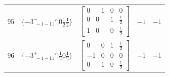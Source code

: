 \documentclass[fleqn,8pt]{jsarticle}
\begin{document}
\begin{longtable}{ccccc}
$ 95 $ & $ \{-3^{-}_{\,\,-1-11}{}'|0 \frac{1}{2} \frac{1}{2}\} $ & $ \begin{bmatrix} 0 & -1 & 0 & 0 \\ 0 & 0 & 1 & \frac{1}{2} \\ 1 & 0 & 0 & \frac{1}{2} \end{bmatrix} $ & $ -1 $ & $ -1 $ \\ \hline
$ 96 $ & $ \{-3^{+}_{\,\,-1-11}{}'|\frac{1}{2} 0 \frac{1}{2}\} $ & $ \begin{bmatrix} 0 & 0 & 1 & \frac{1}{2} \\ -1 & 0 & 0 & 0 \\ 0 & 1 & 0 & \frac{1}{2} \end{bmatrix} $ & $ -1 $ & $ -1 $ \\
\end{longtable}
\end{document}
